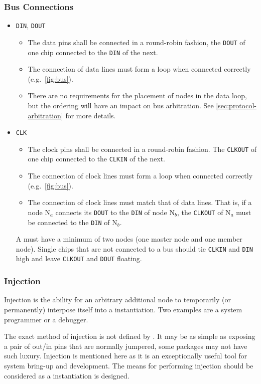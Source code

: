 \subsubsection{Bus Connections}
\label{sec:physical-bus}
\begin{itemize}
  \item {\tt DIN}, {\tt DOUT}
  \begin{itemize}
    \item The data pins shall be connected in a round-robin fashion, the
      {\tt DOUT} of one chip connected to the {\tt DIN} of the next.
    \item The connection of data lines must form a loop when connected
      correctly (e.g.~\cref{fig:bus}).
    \item There are no requirements for the placement of nodes in the data
      loop, but the ordering will have an impact on bus arbitration. See
      \cref{sec:protocol-arbitration} for more details.
  \end{itemize}
  \item {\tt CLK}
  \begin{itemize}
    \item The clock pins shall be connected in a round-robin fashion. The
      {\tt CLKOUT} of one chip connected to the {\tt CLKIN} of the next.
    \item The connection of clock lines must form a loop when connected
      correctly (e.g.~\cref{fig:bus}).
    \item The connection of clock lines must match that of data lines. That
      is, if a node N$_{a}$ connects its {\tt DOUT} to the {\tt DIN} of node
      N$_{b}$, the {\tt CLKOUT} of N$_{a}$ must be connected to the {\tt DIN}
      of N$_{b}$.
  \end{itemize}
  A \bus must have a minimum of two nodes (one master node and one
  member node). Single chips that are not connected to a bus should tie
  {\tt CLKIN} and {\tt DIN} high and leave {\tt CLKOUT} and {\tt DOUT}
  floating.
\end{itemize}


\subsubsection{Injection}
Injection is the ability for an arbitrary additional node to temporarily (or
permanently) interpose itself into a \bus instantiation. Two examples are a
system programmer or a debugger.

The exact method of injection is not defined by \bus. It may be as simple as
exposing a pair of out/in pins that are normally jumpered, some packages may
not have such luxury. Injection is mentioned here as it is an exceptionally
useful tool for system bring-up and development. The means for performing
injection should be considered as a \bus instantiation is designed.



